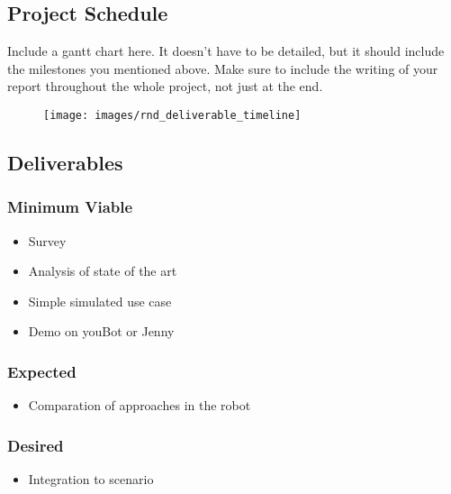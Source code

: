 \documentclass[thesis]{mas_proposal}
\begin{document}
\subsection{Project Schedule}
Include a gantt chart here. It doesn't have to be detailed, but it should include the milestones you mentioned above.
Make sure to include the writing of your report throughout the whole project, not just at the end.

\begin{figure}[h!]
    \caption{}
    \texttt{[image: images/rnd\_deliverable\_timeline]}
    \label{}
\end{figure}

\subsection{Deliverables}
\subsubsection*{Minimum Viable}

\begin{itemize}
    \item Survey
    \item Analysis of state of the art
    \item Simple simulated use case
    \item Demo on youBot or Jenny
\end{itemize}

\subsubsection*{Expected}
\begin{itemize}
    \item Comparation of approaches in the robot
\end{itemize}

\subsubsection*{Desired}
\begin{itemize}
    \item Integration to scenario
\end{itemize}


\nocite{*}

\end{document}
